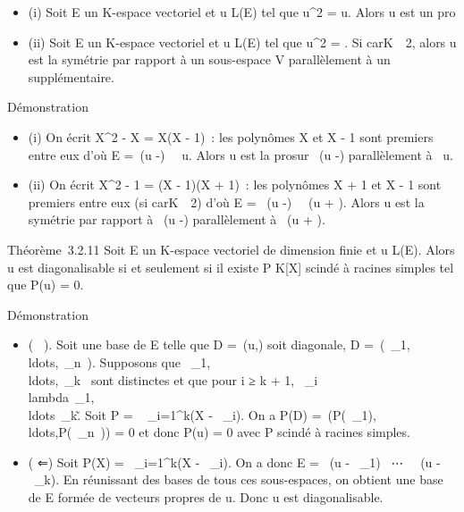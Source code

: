 \documentclass[]{article}
\begin{document}
\begin{itemize}
\itemsep1pt\parskip0pt
\item
  (i) Soit E un K-espace vectoriel et u \in L(E) tel que u^2 =
  u. Alors u est un pro\jmathecteur
\item
  (ii) Soit E un K-espace vectoriel et u \in L(E) tel que u^2 =
  \mathrmId. Si
  carK\mathrel\neq~~2, alors u
  est la symétrie par rapport à un sous-espace V parallèlement à un
  supplémentaire.
\end{itemize}

Démonstration

\begin{itemize}
\itemsep1pt\parskip0pt
\item
  (i) On écrit X^2 - X = X(X - 1)~: les polynômes X et X - 1
  sont premiers entre eux d'où E =\
  \mathrmKer(u -\mathrmId)
  \oplus~\mathrmKer~u. Alors u est
  la pro\jmathection sur
  \mathrmKer~(u
  -\mathrmId) parallèlement à
  \mathrmKer~u.
\item
  (ii) On écrit X^2 - 1 = (X - 1)(X + 1)~: les polynômes X +
  1 et X - 1 sont premiers entre eux (si
  carK\mathrel\neq~~2) d'où E
  = \mathrmKer~(u
  -\mathrmId)
  \oplus~\mathrmKer~(u +
  \mathrmId). Alors u est la symétrie par rapport à
  \mathrmKer~(u
  -\mathrmId) parallèlement à
  \mathrmKer~(u +
  \mathrmId).
\end{itemize}

Théorème~3.2.11 Soit E un K-espace vectoriel de dimension finie et u \in
L(E). Alors u est diagonalisable si et seulement si il existe P \in
K{[}X{]} scindé à racines simples tel que P(u) = 0.

Démonstration

\begin{itemize}
\itemsep1pt\parskip0pt
\item
  ( \rigtharrow~). Soit  une base de E telle que D =\
  \mathrmMat (u,) soit diagonale, D
  =\
  \mathrmdiag(\lambda~\_1,\\ldots,\lambda~\_n~).
  Supposons que
  \lambda~\_1,\\ldots,\lambda~\_k~
  sont distinctes et que pour i ≥ k + 1, \lambda~\_i
  \in\\lambda~\_1,\\ldots\lambda~\_k\~.
  Soit P = \∏ ~
  \_i=1^k(X - \lambda~\_i). On a P(D)
  =\
  \mathrmdiag(P(\lambda~\_1),\\ldots,P(\lambda~\_n~))
  = 0 et donc P(u) = 0 avec P scindé à racines simples.
\item
  ( ⇐) Soit P(X) =\ \∏
   \_i=1^k(X - \lambda~\_i). On a donc E
  = \mathrmKer~(u -
  \lambda~\_1\mathrmId)
  \oplus~⋯
  \oplus~\mathrmKer~(u -
  \lambda~\_k\mathrmId). En réunissant des bases de
  tous ces sous-espaces, on obtient une base de E formée de vecteurs
  propres de u. Donc u est diagonalisable.
\end{itemize}
\end{document}
